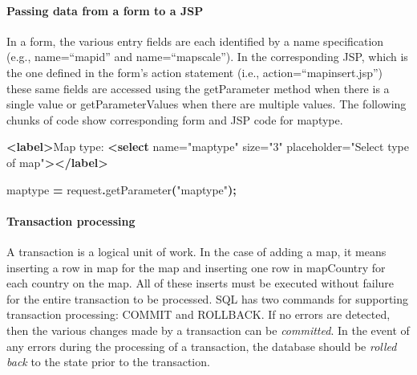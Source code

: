 \documentclass[
]{article}
\newenvironment{Shaded}{\begin{snugshade}}{\end{snugshade}}
\newcommand{\FunctionTok}[1]{\textcolor[rgb]{0.00,0.00,0.00}{#1}}
\newcommand{\KeywordTok}[1]{\textcolor[rgb]{0.13,0.29,0.53}{\textbf{#1}}}
\newcommand{\NormalTok}[1]{#1}
\newcommand{\OperatorTok}[1]{\textcolor[rgb]{0.81,0.36,0.00}{\textbf{#1}}}
\newcommand{\OtherTok}[1]{\textcolor[rgb]{0.56,0.35,0.01}{#1}}
\newcommand{\StringTok}[1]{\textcolor[rgb]{0.31,0.60,0.02}{#1}}
\begin{document}
\hypertarget{passing-data-from-a-form-to-a-jsp}{%
\paragraph*{Passing data from a form to a JSP}\label{passing-data-from-a-form-to-a-jsp}}

In a form, the various entry fields are each identified by a name
specification (e.g., name=``mapid'' and name=``mapscale''). In the
corresponding JSP, which is the one defined in the form's action
statement (i.e., action=``mapinsert.jsp'') these same fields are accessed
using the getParameter method when there is a single value or
getParameterValues when there are multiple values. The following chunks
of code show corresponding form and JSP code for maptype.

\begin{Shaded}
\begin{Highlighting}[]
\KeywordTok{\textless{}label\textgreater{}}\NormalTok{Map type: }\KeywordTok{\textless{}select}\OtherTok{ name=}\StringTok{"maptype"}\OtherTok{ size=}\StringTok{"3"}
\OtherTok{            placeholder=}\StringTok{"Select type of map"}\KeywordTok{\textgreater{}\textless{}/label\textgreater{}}
\end{Highlighting}
\end{Shaded}

\begin{Shaded}
\begin{Highlighting}[]
\NormalTok{maptype }\OperatorTok{=}\NormalTok{ request}\OperatorTok{.}\FunctionTok{getParameter}\OperatorTok{(}\StringTok{"maptype"}\OperatorTok{);}
\end{Highlighting}
\end{Shaded}

\hypertarget{transaction-processing}{%
\paragraph*{Transaction processing}\label{transaction-processing}}

A transaction is a logical unit of work. In the case of adding a map, it
means inserting a row in map for the map and inserting one row in
mapCountry for each country on the map. All of these inserts must be
executed without failure for the entire transaction to be processed. SQL
has two commands for supporting transaction processing: COMMIT and
ROLLBACK. If no errors are detected, then the various changes made by a
transaction can be \emph{committed}. In the event of any errors during the
processing of a transaction, the database should be \emph{rolled back} to the
state prior to the transaction.
\end{document}
